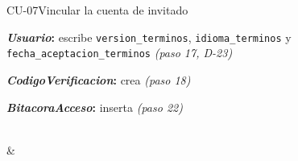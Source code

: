 \begin{fichacu}{CU-07}{Vincular la cuenta de invitado}
{\begin{cudatos}
      \item \textbf{\textit{Usuario}:} escribe \texttt{version\_\allowbreak{}terminos}, \texttt{idioma\_\allowbreak{}terminos} y \texttt{fecha\_\allowbreak{}aceptacion\_\allowbreak{}terminos} \textit{(paso 17, \mbox{D-23})}
      \item \textbf{\textit{CodigoVerificacion}:} crea \textit{(paso 18)}
      \item \textbf{\textit{BitacoraAcceso}:} inserta \textit{(paso 22)}
    \end{cudatos}} \\
   &  \\ \hline
\end{fichacu}
\clearpage
